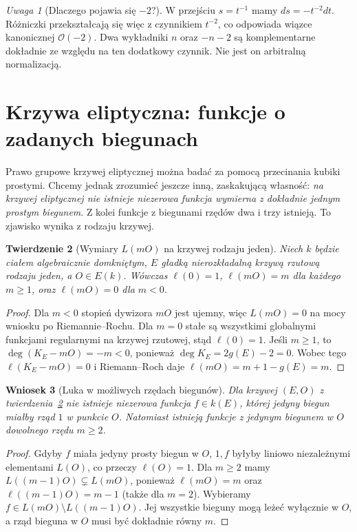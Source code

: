 \documentclass[11pt,a4paper,openany]{report}
\numberwithin{equation}{section}
\theoremstyle{plain}
\newtheorem{twierdzenie}{Twierdzenie}[section]
\newtheorem{wniosek}[twierdzenie]{Wniosek}
\theoremstyle{definition}
\theoremstyle{remark}
\newtheorem{uwaga}[twierdzenie]{Uwaga}
\begin{document}
\begin{uwaga}[Dlaczego pojawia się $-2$?]
W przejściu $s=t^{-1}$ mamy $ds=-t^{-2}dt$.
Różniczki przekształcają się więc z czynnikiem
$t^{-2}$, co odpowiada wiązce kanonicznej
$\mathcal O(-2)$. Dwa wykładniki $n$ oraz $-n-2$
są komplementarne dokładnie ze względu na ten dodatkowy
czynnik. Nie jest on arbitralną normalizacją.
\end{uwaga}

\section{Krzywa eliptyczna: funkcje o zadanych biegunach}
\label{sec:elliptic-poles}

Prawo grupowe krzywej eliptycznej można badać
za pomocą przecinania kubiki prostymi. Chcemy jednak
zrozumieć jeszcze inną, zaskakującą własność:
\emph{na krzywej eliptycznej nie istnieje niezerowa
funkcja wymierna z dokładnie jednym prostym biegunem}.
Z kolei funkcje z biegunami rzędów dwa i trzy istnieją.
To zjawisko wynika z rodzaju krzywej.

\begin{twierdzenie}[Wymiary $L(mO)$ na krzywej rodzaju jeden]
\label{tw:ell-poles}
Niech $k$ będzie ciałem algebraicznie domkniętym,
$E$ gładką nierozkładalną krzywą rzutową rodzaju jeden,
a $O\in E(k)$. Wówczas
$\ell(0)=1$, $\ell(mO)=m$ dla każdego $m\ge1$,
oraz $\ell(mO)=0$ dla $m<0$.
\end{twierdzenie}
\begin{proof}
Dla $m<0$ stopień dywizora $mO$ jest ujemny,
więc $L(mO)=0$ na mocy wniosku po Riemannie--Rochu.
Dla $m=0$ stałe są wszystkimi globalnymi funkcjami
regularnymi na krzywej rzutowej, stąd $\ell(0)=1$.
Jeśli $m\ge1$, to $\deg(K_E-mO)=-m<0$,
ponieważ $\deg K_E=2g(E)-2=0$.
Wobec tego $\ell(K_E-mO)=0$ i Riemann--Roch daje
$\ell(mO)=m+1-g(E)=m$.
\end{proof}

\begin{wniosek}[Luka w możliwych rzędach biegunów]
Dla krzywej $(E,O)$ z twierdzenia~\ref{tw:ell-poles}
nie istnieje niezerowa funkcja $f\in k(E)$, której
\emph{jedyny} biegun miałby rząd $1$ w punkcie $O$.
Natomiast istnieją funkcje z jedynym biegunem
w $O$ dowolnego rzędu $m\ge2$.
\end{wniosek}
\begin{proof}
Gdyby $f$ miała jedyny prosty biegun w $O$,
$1,f$ byłyby liniowo niezależnymi elementami $L(O)$,
co przeczy $\ell(O)=1$.
Dla $m\ge2$ mamy
$L((m-1)O)\subsetneq L(mO)$, ponieważ
$\ell(mO)=m$ oraz $\ell((m-1)O)=m-1$
(także dla $m=2$). Wybieramy
$f\in L(mO)\setminus L((m-1)O)$.
Jej wszystkie bieguny mogą leżeć wyłącznie w $O$,
a rząd bieguna w $O$ musi być dokładnie równy $m$.
\end{proof}
\end{document}
